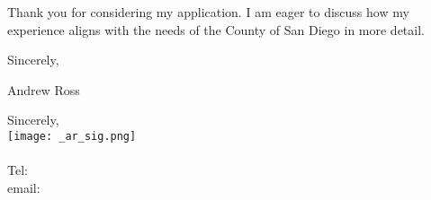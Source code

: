 \documentclass[letterpaper]{article}
\begin{document}
Thank you for considering my application. 
I am eager to discuss how my experience aligns with the needs of the County of San Diego in more detail.

Sincerely,


Andrew Ross

Sincerely,\\
    \hspace{1em}
    \texttt{[image: \_ar\_sig.png]} \\
    \CVsigname \\
    \small
    Tel: \CVphone \\
    email: \CVemail
\end{document}
